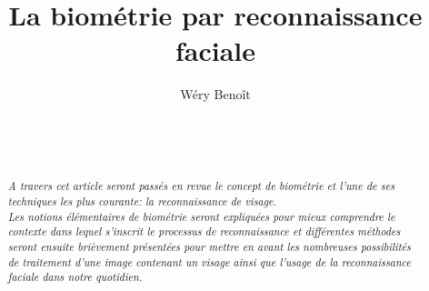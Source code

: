 \documentclass{sig-alternate-05-2015}
\begin{document}
\title{La biométrie par reconnaissance faciale}
\author{
Wéry Benoît\\
       \\
       \\
       \affaddr{\today}\\
}
\maketitle

\begin{abstract}
\textit{
A travers cet article seront passés en revue le concept de biométrie et l'une de ses techniques les plus courante: la reconnaissance de visage.\\Les notions élémentaires de biométrie seront expliquées pour mieux comprendre le contexte dans lequel s'inscrit le processus de reconnaissance et différentes méthodes seront ensuite brièvement présentées pour mettre en avant les nombreuses possibilités de traitement d'une image contenant un visage ainsi que l'usage de la reconnaissance faciale dans notre quotidien.}
\end{abstract}





%





\appendix
\end{document}
